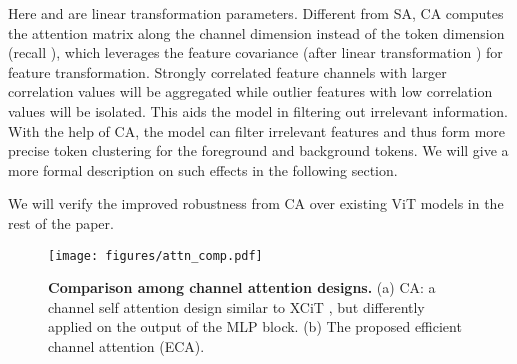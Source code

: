 \documentclass[nohyperref]{article}
\theoremstyle{plain}
\theoremstyle{definition}
\theoremstyle{remark}
\begin{document}
\vspace{-0.1cm}
Here  and  are linear transformation parameters.  
Different from SA, CA  computes the attention matrix along the channel dimension instead of the token  dimension (recall ), which leverages the feature covariance (after linear transformation ) for   feature  transformation. Strongly correlated feature channels with larger correlation values  will be aggregated while outlier features with low correlation values will be isolated.  This   aids the model in filtering out irrelevant information. 
With the help of CA, the model can filter irrelevant features and thus form more precise token clustering for the foreground and background tokens. We will give a more formal description on such effects in the following section.


We will verify the improved robustness from CA over existing ViT models in the rest of the paper.



\begin{figure}[t] 
\centering
\texttt{[image: figures/attn\_comp.pdf]}
\caption{\textbf{Comparison among channel attention designs.} (a) CA: a channel self attention design similar to XCiT \cite{el2021xcit}, but differently applied on the output of the MLP block. (b) The proposed efficient channel attention (ECA). 
}
\vspace{-3mm}
\label{fig:csa_arch}
\end{figure}
\end{document}
